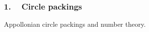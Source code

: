 
\begin{frame}
\frametitle{1. ~ Circle packings}


Appollonian circle packings and number theory.

\end{frame}
